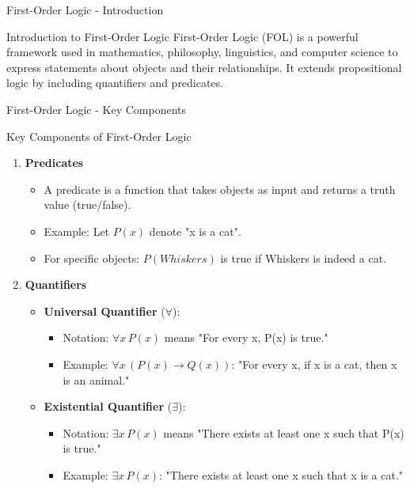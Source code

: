 \documentclass[aspectratio=169]{beamer}
\begin{document}
\begin{frame}[fragile]{First-Order Logic - Introduction}
    \begin{block}{Introduction to First-Order Logic}
        First-Order Logic (FOL) is a powerful framework used in mathematics, philosophy, linguistics, and computer science to express statements about objects and their relationships. 
        It extends propositional logic by including quantifiers and predicates.
    \end{block}
\end{frame}

\begin{frame}[fragile]{First-Order Logic - Key Components}
    \begin{block}{Key Components of First-Order Logic}
        \begin{enumerate}
            \item \textbf{Predicates}
                \begin{itemize}
                    \item A predicate is a function that takes objects as input and returns a truth value (true/false).
                    \item Example: Let \( P(x) \) denote "x is a cat".
                    \item For specific objects: \( P(Whiskers) \) is true if Whiskers is indeed a cat.
                \end{itemize}
                
            \item \textbf{Quantifiers}
                \begin{itemize}
                    \item \textbf{Universal Quantifier} (\( \forall \)): 
                        \begin{itemize}
                            \item Notation: \( \forall x \, P(x) \) means "For every x, P(x) is true."
                            \item Example: \( \forall x \, (P(x) \rightarrow Q(x)) \): "For every x, if x is a cat, then x is an animal."
                        \end{itemize}
                    \item \textbf{Existential Quantifier} (\( \exists \)): 
                        \begin{itemize}
                            \item Notation: \( \exists x \, P(x) \) means "There exists at least one x such that P(x) is true."
                            \item Example: \( \exists x \, P(x) \): "There exists at least one x such that x is a cat."
                        \end{itemize}
                \end{itemize}
            

\end{enumerate}
\end{block}
\end{frame}
\end{document}
